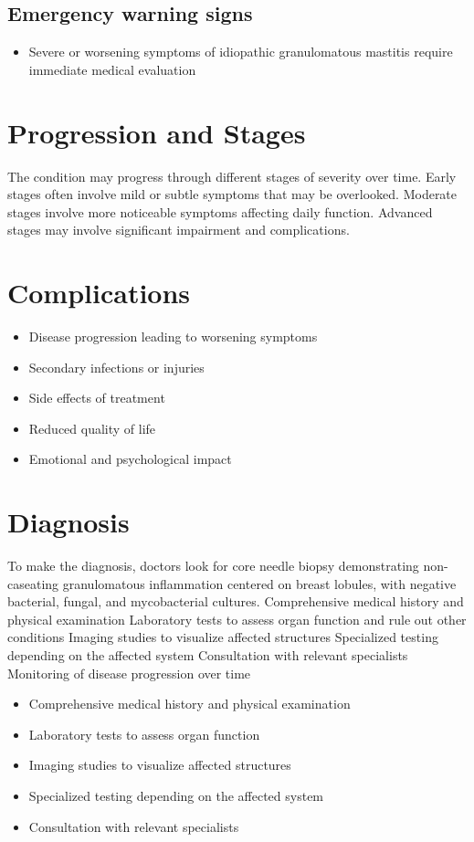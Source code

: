 \subsection{Emergency warning signs}
\begin{itemize}[noitemsep]
  \item Severe or worsening symptoms of idiopathic granulomatous mastitis require immediate medical evaluation
\end{itemize}
\section{Progression and Stages}
The condition may progress through different stages of severity over time. Early stages often involve mild or subtle symptoms that may be overlooked. Moderate stages involve more noticeable symptoms affecting daily function. Advanced stages may involve significant impairment and complications.
\section{Complications}
\begin{itemize}[noitemsep]
  \item Disease progression leading to worsening symptoms
  \item Secondary infections or injuries
  \item Side effects of treatment
  \item Reduced quality of life
  \item Emotional and psychological impact
\end{itemize}
\section{Diagnosis}
To make the diagnosis, doctors look for core needle biopsy demonstrating non-caseating granulomatous inflammation centered on breast lobules, with negative bacterial, fungal, and mycobacterial cultures. Comprehensive medical history and physical examination Laboratory tests to assess organ function and rule out other conditions Imaging studies to visualize affected structures Specialized testing depending on the affected system Consultation with relevant specialists Monitoring of disease progression over time

\begin{itemize}[noitemsep]
  \item Comprehensive medical history and physical examination
  \item Laboratory tests to assess organ function
  \item Imaging studies to visualize affected structures
  \item Specialized testing depending on the affected system
  \item Consultation with relevant specialists
\end{itemize}
